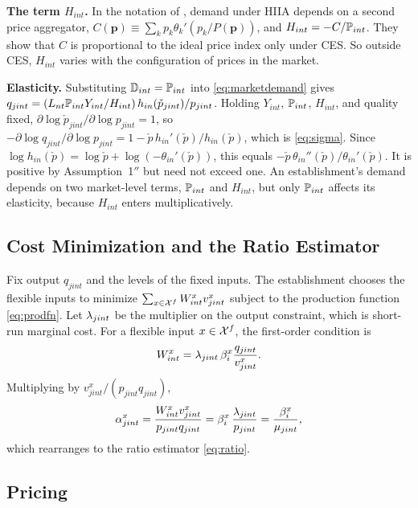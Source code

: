 \textbf{The term $H_{int}$.}
In the notation of \textcite{Matsuyama&Ushev17}, demand under HIIA depends on a second price aggregator, $C(\mathbf{p}) \equiv \sum_k p_k \theta_k'(p_k/P(\mathbf{p}))$, and $H_{int} = -C/\P_{int}$.
They show that $C$ is proportional to the ideal price index only under CES.
So outside CES, $H_{int}$ varies with the configuration of prices in the market.

\textbf{Elasticity.}
Substituting $\mathbb{D}_{int} = \P_{int}$ into \eqref{eq:marketdemand} gives $q_{jint} = (L_{nt} \P_{int} Y_{int}/H_{int}) \, h_{in}(\check{p}_{jint})/p_{jint}$.
Holding $Y_{int}$, $\P_{int}$, $H_{int}$, and quality fixed, $\partial \log \check{p}_{jint}/\partial \log p_{jint} = 1$, so $-\partial \log q_{jint}/\partial \log p_{jint} = 1 - \check{p}\, h_{in}'(\check{p})/h_{in}(\check{p})$, which is \eqref{eq:sigma}.
Since $\log h_{in}(\check{p}) = \log \check{p} + \log(-\theta_{in}'(\check{p}))$, this equals $-\check{p}\,\theta_{in}''(\check{p})/\theta_{in}'(\check{p})$.
It is positive by Assumption~1$''$ but need not exceed one.
An establishment's demand depends on two market-level terms, $\P_{int}$ and $H_{int}$, but only $\P_{int}$ affects its elasticity, because $H_{int}$ enters multiplicatively.

\subsection{Cost Minimization and the Ratio Estimator}\label{sec:app-cost}

Fix output $q_{jint}$ and the levels of the fixed inputs.
The establishment chooses the flexible inputs to minimize $\sum_{x \in \cX^f} W^x_{int} v^x_{jint}$ subject to the production function \eqref{eq:prodfn}.
Let $\l_{jint}$ be the multiplier on the output constraint, which is short-run marginal cost.
For a flexible input $x \in \cX^f$, the first-order condition is
\begin{equation*}
	W^x_{int} = \l_{jint} \, \b^x_i \frac{q_{jint}}{v^x_{jint}}.
\end{equation*}
Multiplying by $v^x_{jint}/(p_{jint} q_{jint})$,
\begin{equation*}
	\a^x_{jint} = \frac{W^x_{int} v^x_{jint}}{p_{jint} q_{jint}} = \b^x_i \, \frac{\l_{jint}}{p_{jint}} = \frac{\b^x_i}{\m_{jint}},
\end{equation*}
which rearranges to the ratio estimator \eqref{eq:ratio}.

\subsection{Pricing}\label{sec:app-pricing}

